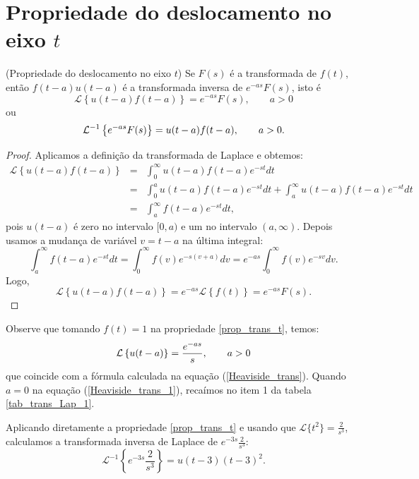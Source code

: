  \section{Propriedade do deslocamento no eixo $t$}
\begin{teo}{\label{prop_trans_t}}(Propriedade do deslocamento no eixo $t$) Se $F(s)$ é a transformada de $f(t)$, então $f(t-a)u(t-a)$ é a transformada inversa de $e^{-as}F(s)$, isto é
\begin{equation}
\mathcal{L}\left\{u(t-a)f(t-a)\right\} =e^{-as}F(s),\qquad a>0
\end{equation}
ou
\begin{equation}{\label{eq_trans_t_inv}}
\mathcal{L}^{-1} \left\{e^{-as}F(s)\right\} =u(t-a)f(t-a),\qquad a>0.
\end{equation}
\end{teo}
\begin{proof}Aplicamos a definição da transformada de Laplace e obtemos:
\begin{eqnarray*}
\mathcal{L}\left\{u(t-a)f(t-a)\right\}&=&\int_0^\infty u(t-a)f(t-a)e^{-st}dt\\
&=&\int_0^a u(t-a)f(t-a)e^{-st}dt+\int_a^\infty u(t-a)f(t-a)e^{-st}dt\\
&=&\int_a^\infty f(t-a)e^{-st}dt,
\end{eqnarray*}
pois $u(t-a)$ é zero no intervalo $[0,a)$ e um no intervalo $(a,\infty)$. Depois usamos a mudança de variável $v=t-a$ na última integral:
\begin{equation*}
\int_a^\infty f(t-a)e^{-st}dt=\int_0^\infty f(v)e^{-s(v+a)}dv=e^{-as}\int_0^\infty f(v)e^{-sv}dv.
\end{equation*}
Logo,
\begin{equation}
\mathcal{L}\left\{u(t-a)f(t-a)\right\}=e^{-as}\mathcal{L}\left\{f(t)\right\}=e^{-as}F(s).
\end{equation}
\end{proof}
Observe que tomando $f(t)=1$ na propriedade \ref{prop_trans_t}, temos:
\begin{equation}{\label{Heaviside_trans_1}}
\mathcal{L}\left\{u(t-a)\right\} =\frac{e^{-as}}{s},\qquad a>0
\end{equation}
que coincide com a fórmula calculada na equação (\ref{Heaviside_trans}). Quando $a=0$ na equação (\ref{Heaviside_trans_1}), recaímos no item 1 da tabela \ref{tab_trans_Lap_1}.
\begin{ex} Aplicando diretamente a propriedade \ref{prop_trans_t} e usando que $\mathcal{L}\{t^2\}=\frac{2}{s^3}$, calculamos a transformada inversa de Laplace de $e^{-3s}\frac{2}{s^3}$:
\begin{equation}
\mathcal{L}^{-1}\left\{e^{-3s}\frac{2}{s^3}\right\}=u(t-3)(t-3)^2.
\end{equation}
\end{ex}
